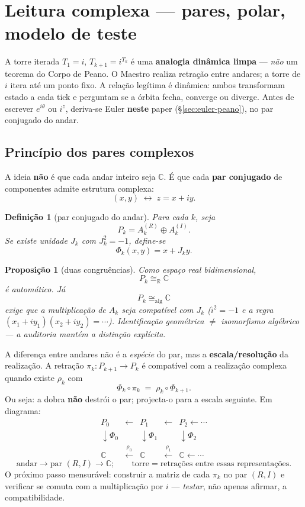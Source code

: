\documentclass[11pt,a4paper]{article}
\newtheorem{definicao}{Definição}
\newtheorem{proposicao}{Proposição}
\begin{document}
\section{Leitura complexa --- pares, polar, modelo de teste}\label{sec:pares-complexos}

A torre iterada $T_1=i$, $T_{k+1}=i^{T_k}$ é uma
\textbf{analogia dinâmica limpa} --- \emph{não} um teorema do Corpo de
Peano. O Maestro realiza retração entre andares; a torre de $i$ itera
até um ponto fixo. A relação legítima é dinâmica: ambos transformam
estado a cada tick e perguntam se a órbita fecha, converge ou diverge.
Antes de escrever $e^{i\theta}$ ou $i^{z}$, deriva-se Euler
\textbf{neste} paper (\S\ref{sec:euler-peano}), no par conjugado do
andar.

\subsection*{Princípio dos pares complexos}

A ideia \textbf{não} é que cada andar inteiro seja $\mathbb{C}$. É que
cada \textbf{par conjugado} de componentes admite estrutura complexa:
\[
\boxed{(x,y)\;\longleftrightarrow\; z=x+iy}.
\]

\begin{definicao}[par conjugado do andar]\label{def:par-RI}
Para cada $k$, seja
\[
\boxed{P_k = A_k^{(R)}\oplus A_k^{(I)}}.
\]
Se existe unidade $J_k$ com $J_k^{2}=-1$, define-se
\[
\boxed{\Phi_k(x,y)=x+J_k y}.
\]
\end{definicao}

\begin{proposicao}[duas congruências]\label{prop:duas-cong}
Como espaço real bidimensional,
\[
\boxed{P_k\cong_{\mathbb{R}}\mathbb{C}}
\]
é automático. Já
\[
\boxed{P_k\cong_{\mathrm{alg}}\mathbb{C}}
\]
exige que a multiplicação de $A_k$ seja compatível com $J_k$
($i^{2}=-1$ e a regra $(x_1+iy_1)(x_2+iy_2)=\cdots$). Identificação
geométrica $\neq$ isomorfismo algébrico --- a auditoria mantém a
distinção explícita.
\end{proposicao}

A diferença entre andares não é a \emph{espécie} do par, mas a
\textbf{escala/resolução} da realização. A retração $\pi_k\colon P_{k+1}\to P_k$
é compatível com a realização complexa quando existe $\rho_k$ com
\[
\boxed{\Phi_k\circ\pi_k \;=\; \rho_k\circ\Phi_{k+1}}.
\]
Ou seja: a dobra \textbf{não} destrói o par; projecta-o para a escala
seguinte. Em diagrama:
\[
\boxed{
\begin{array}{ccccc}
P_0 & \leftarrow & P_1 & \leftarrow & P_2\leftarrow\cdots \\
\downarrow\Phi_0 && \downarrow\Phi_1 && \downarrow\Phi_2 \\
\mathbb{C} & \xleftarrow{\rho_0} & \mathbb{C}
& \xleftarrow{\rho_1} & \mathbb{C}\leftarrow\cdots
\end{array}
}
\]
\[
\boxed{
\text{andar}\to\text{par }(R,I)\to\mathbb{C};
\qquad
\text{torre}=\text{retrações entre essas representações}.
}
\]
O próximo passo mensurável: construir a matriz de cada $\pi_k$ no par
$(R,I)$ e verificar se comuta com a multiplicação por $i$ ---
\emph{testar}, não apenas afirmar, a compatibilidade.
\end{document}
